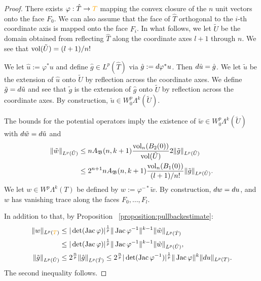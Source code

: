 \documentclass[10pt,letterpaper]{article}
\newcommand\cye[1]{%
  \protect\leavevmode
  \begingroup
    \color{red!35!yellow}%
    #1%
  \endgroup
}
\begin{document}
\begin{proof}
    There exists $\varphi : \hat T \rightarrow \cye{T}$ mapping the convex closure of the $n$ unit vectors onto the face $F_0$.
    We can also assume that the face of $\hat T$
    orthogonal to the $i$-th coordinate axis is mapped 
    onto the face $F_i$. 
    In what follows, we let $\tilde U$ be the domain obtained from reflecting $\hat T$ along the coordinate axes $l+1$ through $n$. 
    We see that $\operatorname{vol}(\tilde U) = (l+1)/n!$
    
    
    We let $\hat u := \varphi^{\ast} u$ and define $\hat g \in L^{p}(\hat T)$ via $\hat g := d \varphi^{\ast} u$. 
    Then $d \hat u = \hat g$. 
    We let $\tilde u$ be the extension of $\hat u$ onto $\tilde U$ by reflection across the coordinate axes.
    We define $\tilde g = d \tilde u$
    and see that $\tilde g$ is the extension of $\hat g$ onto $\tilde U$ by reflection across the coordinate axes. 
    By construction, $\tilde u \in W^{p}_{0}\Lambda^{k}(\tilde U)$.
    
    The bounds for the potential operators imply 
    the existence of $\tilde w \in W^{p}_{0}\Lambda^{k}(\tilde U)$
    with $d \tilde w = d \tilde u$ and 
    \begin{align*}
        \| \tilde w \|_{L^{p}(\tilde U)}
        &\leq 
        n A_{{\mathfrak B}}(n,k+1) \frac{ \operatorname{vol}_{n}(B_2(0)) }{ \operatorname{vol}(\tilde U) } 
        2
        \| \tilde g \|_{L^{p}(\tilde U)}
        \\&\leq 
        2^{n+1} n A_{{\mathfrak B}}(n,k+1) \frac{ \operatorname{vol}_{n}(B_1(0)) }{ (l+1)/n! } 
        \| \tilde g \|_{L^{p}(\tilde U)}
        .
    \end{align*}
    We let $w \in W^{p}\Lambda^{k}(T)$ be defined by $w := \varphi^{-\ast} \tilde w$.
    By construction, $d w = d u$,
    and $w$ has vanishing trace along the faces $F_{0},\dots,F_{l}$.
    
    In addition to that, by \cye{Proposition}~\ref{proposition:pullbackestimate}:
    \begin{align*}
        \| w \|_{L^{p}(\cye{T})}
        &\leq 
        |\det(\Jacobian \varphi)|^{\frac 1 p} 
        \| \Jacobian \varphi^{-1} \|^{k-1}
        \| \tilde w \|_{L^{p}(\hat T)}
        \\&
        \leq 
        |\det(\Jacobian \varphi)|^{\frac 1 p} 
        \| \Jacobian \varphi^{-1} \|^{k-1}
        \| \tilde w \|_{L^{p}(\tilde U)}
        ,
        \\
        \| \tilde g \|_{L^{p}(\tilde U)}
        &\leq 
        2^{\frac n p}
        \| \hat g \|_{L^{p}(\hat T)}
        \leq 
        2^{\frac n p}
        |\det( \Jacobian \varphi^{-1} )|^{\frac 1 p} 
        \| \Jacobian \varphi \|^{k}
        \| \cartan u \|_{L^{p}(T)}
        .
    \end{align*}
    The second inequality follows.
\end{proof}
\end{document}
